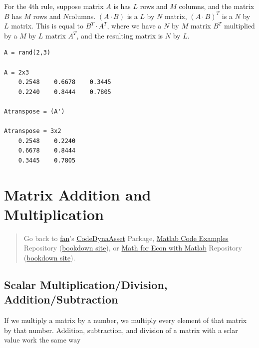 \documentclass[
]{book}
\begin{document}
For the 4th rule, suppose matrix \(A\) is has \(L\) rows and \(M\) columns,
and the matrix \(B\) has \(M\) rows and \(N\)columns. \((A\cdot B)\) is a \(L\) by
\(N\) matrix, \((A\cdot B)^T\) is a \(N\) by \(L\) matrix. This is equal to
\(B^T \cdot A^T\), where we have a \(N\) by \(M\) matrix \(B^T\) multiplied by a
\(M\) by \(L\) matrix \(A^T\), and the resulting matrix is \(N\) by \(L\).

\begin{verbatim}
A = rand(2,3)

A = 2x3    
    0.2548    0.6678    0.3445
    0.2240    0.8444    0.7805

Atranspose = (A')

Atranspose = 3x2    
    0.2548    0.2240
    0.6678    0.8444
    0.3445    0.7805
\end{verbatim}

\hypertarget{matrix-addition-and-multiplication}{%
\section{Matrix Addition and Multiplication}\label{matrix-addition-and-multiplication}}

\begin{quote}
Go back to \href{http://fanwangecon.github.io/}{fan}'s \href{https://fanwangecon.github.io/CodeDynaAsset/}{CodeDynaAsset} Package, \href{https://fanwangecon.github.io/M4Econ/}{Matlab Code Examples} Repository (\href{https://fanwangecon.github.io/M4Econ/bookdown}{bookdown site}), or \href{https://fanwangecon.github.io/Math4Econ/}{Math for Econ with Matlab} Repository (\href{https://fanwangecon.github.io/Math4Econ/bookdown}{bookdown site}).
\end{quote}

\hypertarget{scalar-multiplicationdivision-additionsubtraction}{%
\subsection{Scalar Multiplication/Division, Addition/Subtraction}\label{scalar-multiplicationdivision-additionsubtraction}}

If we multiply a matrix by a number, we multiply every element of that
matrix by that number. Addition, subtraction, and division of a matrix
with a sclar value work the same way
\end{document}
